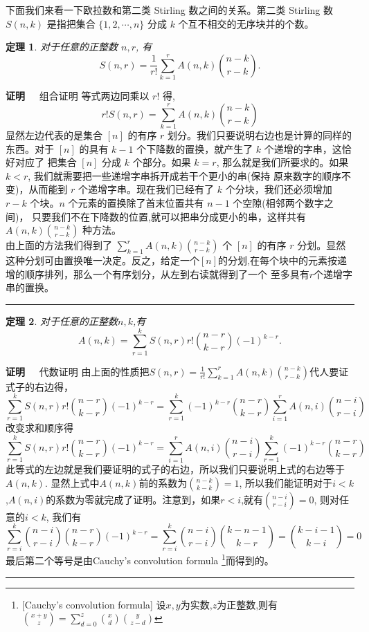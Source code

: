 \documentclass[a4paper,11pt]{article}
\newtheorem{thm}{定理}[section]
\def\qed{\nopagebreak\hfill{\rule{4pt}{7pt}}\medbreak}
\def\pf{{\bf 证明~~ }}
\begin{document}
下面我们来看一下欧拉数和第二类 Stirling 数之间的关系。第二类
Stirling 数 $S(n,k)$ 是指把集合 $\{1,2,\cdots,n\}$ 分成 $k$
个互不相交的无序块并的个数。

\begin{thm}
对于任意的正整数 $n,r$, 有
\begin{equation}
S(n,r)=\frac{1}{r!}\sum_{k=1}^{r}A(n,k){n-k\choose r-k}.
\end{equation}
\end{thm}

\pf{组合证明}
 等式两边同乘以
$r!$ 得, $$r!S(n,r)=\sum_{k=1}^{r}A(n,k){n-k\choose r-k}$$
显然左边代表的是集合 $[n]$ 的有序 $r$
划分。我们只要说明右边也是计算的同样的东西。对于 $[n]$ 的具有 $k-1$
个下降数的置换，就产生了 $k$ 个递增的字串，这恰好对应了 把集合 $[n]$
分成 $k$ 个部分。如果 $k=r$, 那么就是我们所要求的。如果 $k<r$,
我们就需要把一些递增字串拆开成若干个更小的串(保持
原来数字的顺序不变)，从而能到 $r$ 个递增字串。现在我们已经有了 $k$
个分块，我们还必须增加 $r-k$ 个块。$n$ 个元素的置换除了首末位置共有
$n-1$ 个空隙(相邻两个数字之间)，
只要我们不在下降数的位置,就可以把串分成更小的串，这样共有$A(n,k){n-k\choose
r-k}$ 种方法。
\\由上面的方法我们得到了 $\sum_{k=1}^{r}A(n,k){n-k\choose
r-k}$ 个 $[n]$ 的有序 $r$
分划。显然这种分划可由置换唯一决定。反之，给定一个$[n]$的分划,在每个块中的元素按递增的顺序排列，那么一个有序划分，从左到右读就得到了一个
至多具有$r$个递增字串的置换。\qed

\begin{thm}
对于任意的正整数$n,k$,有
\begin{equation}
A(n,k)=\sum_{r=1}^{k}S(n,r)r!{n-r\choose k-r}(-1)^{k-r}.
\end{equation}
\end{thm}

\pf{代数证明}
由上面的性质把$S(n,r)=\frac{1}{r!}\sum_{k=1}^{r}A(n,k){n-k\choose
r-k}$代人要证式子的右边得，
$$\sum_{r=1}^{k}S(n,r)r!{n-r\choose k-r}(-1)^{k-r}=\sum_{r=1}^{k}(-1)^{k-r}{n-r\choose k-r}\sum_{i=1}^{r}A(n,i){n-i\choose
r-i}$$ 改变求和顺序得
$$\sum_{r=1}^{k}S(n,r)r!{n-r\choose k-r}(-1)^{k-r}=\sum_{i=1}^{r}A(n,i){n-i\choose r-i}\sum_{r=1}^{k}(-1)^{k-r}{n-r\choose
k-r}$$
此等式的左边就是我们要证明的式子的右边，所以我们只要说明上式的右边等于$A(n,k)$.
显然上式中$A(n,k)$前的系数为${n-k\choose k-k}=1$,
所以我们能证明对于$i<k$,$A(n,i)$的系数为零就完成了证明。注意到，如果$r<i$,就有${n-i\choose
r-i}=0$, 则对任意的$i<k$, 我们有
$$\sum_{r=i}^{k}{n-i\choose r-i}{n-r\choose k-r}(-1)^{k-r}=\sum_{r=i}^{k}{n-i\choose r-i}{k-n-1\choose k-r}={k-i-1\choose k-i}=0$$
最后第二个等号是由Cauchy's convolution formula \footnote{[Cauchy's
convolution formula] 设$x,y$为实数,$z$为正整数,则有${x+y\choose
z}=\sum_{d=0}^{z}{x\choose d}{y\choose z-d}$}而得到的。\qed
\end{document}
